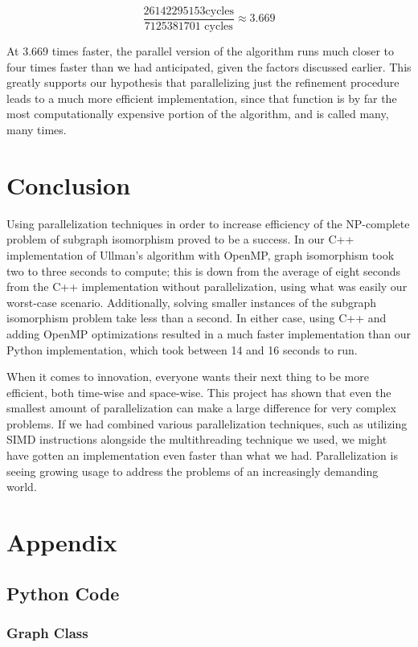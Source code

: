 \documentclass{article}
\begin{document}
  \[ \frac{26142295153 \mathrm{ cycles}}{7125381701 \textrm{ cycles}} \approx 3.669 \]

  At 3.669 times faster, the parallel version of the algorithm runs much closer to four times faster than we had anticipated, given the factors discussed earlier. This greatly supports our hypothesis that parallelizing just the refinement procedure leads to a much more efficient implementation, since that function is by far the most computationally expensive portion of the algorithm, and is called many, many times.

\section{Conclusion}
  Using parallelization techniques in order to increase efficiency of the NP-complete problem of subgraph isomorphism proved to be a success. In our C++ implementation of Ullman's algorithm with OpenMP, graph isomorphism took two to three seconds to compute; this is down from the average of eight seconds from the C++ implementation without parallelization, using what was easily our worst-case scenario. Additionally, solving smaller instances of the subgraph isomorphism problem take less than a second. In either case, using C++ and adding OpenMP optimizations resulted in a much faster implementation than our Python implementation, which took between 14 and 16 seconds to run. 
  
  When it comes to innovation, everyone wants their next thing to be more efficient, both time-wise and space-wise. This project has shown that even the smallest amount of parallelization can make a large difference for very complex problems. If we had combined various parallelization techniques, such as utilizing SIMD instructions alongside the multithreading technique we used, we might have gotten an implementation even faster than what we had. Parallelization is seeing growing usage to address the problems of an increasingly demanding world.

\section{Appendix}
  \subsection{Python Code}
    \subsubsection{Graph Class}
      
\end{document}
